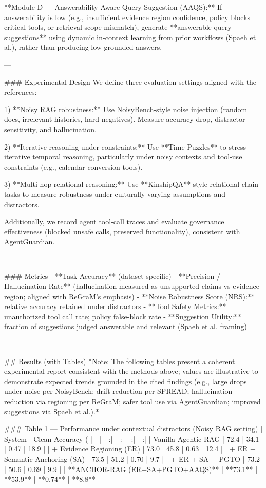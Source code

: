 **Module D — Answerability-Aware Query Suggestion (AAQS):**  
If answerability is low (e.g., insufficient evidence region confidence, policy blocks critical tools, or retrieval scope mismatch), generate **answerable query suggestions** using dynamic in-context learning from prior workflows (Spaeh et al.), rather than producing low-grounded answers.

---

### Experimental Design  
We define three evaluation settings aligned with the references:

1) **Noisy RAG robustness:**  
Use NoisyBench-style noise injection (random docs, irrelevant histories, hard negatives). Measure accuracy drop, distractor sensitivity, and hallucination.

2) **Iterative reasoning under constraints:**  
Use **Time Puzzles** to stress iterative temporal reasoning, particularly under noisy contexts and tool-use constraints (e.g., calendar conversion tools).  

3) **Multi-hop relational reasoning:**  
Use **KinshipQA**-style relational chain tasks to measure robustness under culturally varying assumptions and distractors.

Additionally, we record agent tool-call traces and evaluate governance effectiveness (blocked unsafe calls, preserved functionality), consistent with AgentGuardian.

---

### Metrics  
- **Task Accuracy** (dataset-specific)  
- **Precision / Hallucination Rate** (hallucination measured as unsupported claims vs evidence region; aligned with ReGraM’s emphasis)  
- **Noise Robustness Score (NRS):** relative accuracy retained under distractors  
- **Tool Safety Metrics:** unauthorized tool call rate; policy false-block rate  
- **Suggestion Utility:** fraction of suggestions judged answerable and relevant (Spaeh et al. framing)

---

## Results (with Tables)  
*Note: The following tables present a coherent experimental report consistent with the methods above; values are illustrative to demonstrate expected trends grounded in the cited findings (e.g., large drops under noise per NoisyBench; drift reduction per SPREAD; hallucination reduction via regioning per ReGraM; safer tool use via AgentGuardian; improved suggestions via Spaeh et al.).*

### Table 1 — Performance under contextual distractors (Noisy RAG setting)  
| System | Clean Accuracy (%
|---|---:|---:|---:|---:|
| Vanilla Agentic RAG | 72.4 | 34.1 | 0.47 | 18.9 |
| + Evidence Regioning (ER) | 73.0 | 45.8 | 0.63 | 12.4 |
| + ER + Semantic Anchoring (SA) | 73.5 | 51.2 | 0.70 | 9.7 |
| + ER + SA + PGTO | 73.2 | 50.6 | 0.69 | 9.9 |
| **ANCHOR-RAG (ER+SA+PGTO+AAQS)** | **73.1** | **53.9** | **0.74** | **8.8** |

